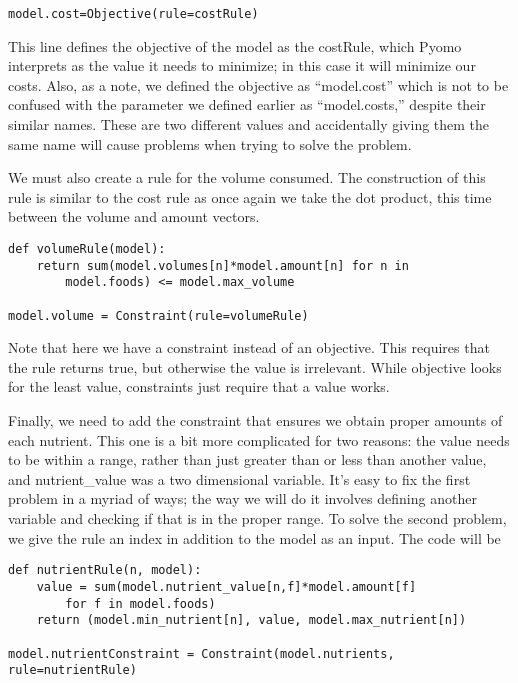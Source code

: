 \documentclass{article}
\begin{document}
\begin{verbatim}model.cost=Objective(rule=costRule) \end{verbatim}

This line defines the objective of the model as the costRule,  which Pyomo interprets as the value it needs to minimize; in this case it will minimize our costs.  Also, as a note, we defined the objective as ``model.cost'' which is not to be confused with the parameter we defined earlier as ``model.costs,'' despite their similar names.  These are two different values and accidentally giving them the same name will cause problems when trying to solve the problem.

We must also create a rule for the volume consumed.  The construction of this rule is similar to the cost rule as once again we take the dot product, this time between the volume and amount vectors. 

\begin{verbatim}def volumeRule(model):
    return sum(model.volumes[n]*model.amount[n] for n in 
        model.foods) <= model.max_volume

model.volume = Constraint(rule=volumeRule)
\end{verbatim}

Note that here we have a constraint instead of an objective.  This requires that the rule returns true, but otherwise the value is irrelevant.  While objective looks for the least value, constraints just require that a value works.

Finally, we need to add the constraint that ensures we obtain proper amounts of each nutrient.  This one is a bit more complicated for two reasons: the value needs to be within a range, rather than just greater than or less than another value, and nutrient\_value was a two dimensional variable.  It's easy to fix the first problem in a myriad of ways; the way we will do it involves defining another variable and checking if that is in the proper range.  To solve the second problem, we give the rule an index in addition to the model as an input.  The code will be

\begin{verbatim}
def nutrientRule(n, model):
    value = sum(model.nutrient_value[n,f]*model.amount[f] 
        for f in model.foods)
    return (model.min_nutrient[n], value, model.max_nutrient[n])

model.nutrientConstraint = Constraint(model.nutrients, rule=nutrientRule)
\end{verbatim}
\end{document}
